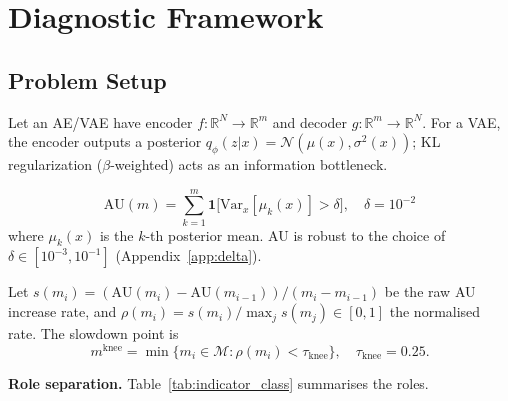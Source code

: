\documentclass[make,article,submit,pdftex,moreauthors]{Definitions/mdpi}
\newcommand{\R}{\mathbb{R}}
\newcommand{\mknee}{m^{\mathrm{knee}}}
\begin{document}
\section{Diagnostic Framework}\label{sec:framework}

\subsection{Problem Setup}\label{sec:framework_setup}

Let an AE/VAE have encoder $f:\R^N\!\to\R^m$ and decoder $g:\R^m\!\to\R^N$.
For a VAE, the encoder outputs a posterior $q_\phi(z|x)=\mathcal{N}(\mu(x),\sigma^2(x))$;
KL regularization ($\beta$-weighted) acts as an information bottleneck.

\begin{definition}
\begin{equation}
  \mathrm{AU}(m)=\sum_{k=1}^{m}\mathbf{1}\bigl[\mathrm{Var}_x[\mu_k(x)]>\delta\bigr],
  \quad\delta=10^{-2}
  \label{eq:au_def}
\end{equation}
where $\mu_k(x)$ is the $k$-th posterior mean.
AU is robust to the choice of $\delta\in[10^{-3},10^{-1}]$ (Appendix~\ref{app:delta}).
\end{definition}

\begin{definition}
Let $s(m_i)=({\mathrm{AU}(m_i)-\mathrm{AU}(m_{i-1})})/({m_i-m_{i-1}})$
be the raw AU increase rate, and
$\rho(m_i)=s(m_i)/\max_j s(m_j)\in[0,1]$ the normalised rate.
The slowdown point is
\begin{equation}
  \mknee=\min\{m_i\in\mathcal{M}:\rho(m_i)<\tau_{\mathrm{knee}}\},
  \quad\tau_{\mathrm{knee}}=0.25.
  \label{eq:mknee}
\end{equation}
\end{definition}

\textbf{Role separation.} Table~\ref{tab:indicator_class} summarises the roles.
\end{document}
